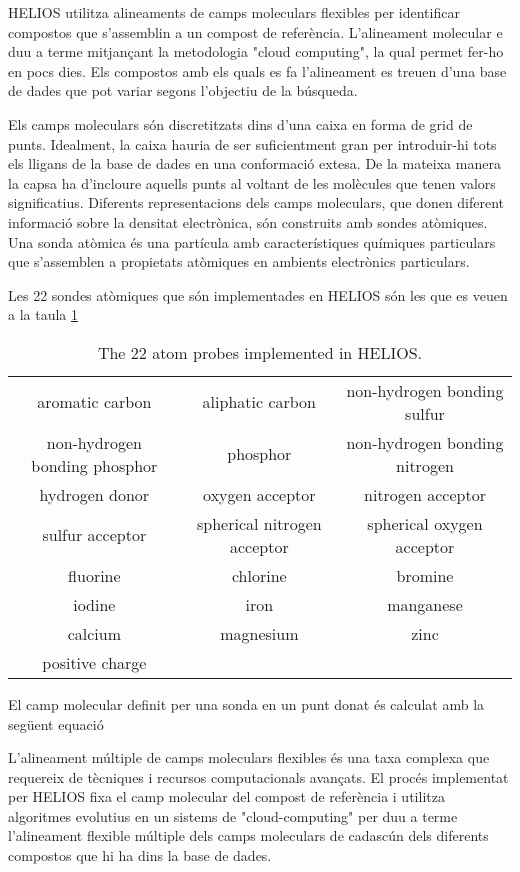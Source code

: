 \documentclass[titlepage,a4paper,12pt]{book}
\begin{document}
HELIOS utilitza alineaments de camps moleculars flexibles per identificar compostos que s'assemblin a un compost de referència. L'alineament molecular e duu a terme mitjançant la metodologia "cloud computing", la qual permet fer-ho en pocs dies. Els compostos amb els quals es fa l'alineament es treuen d'una base de dades que pot variar segons l'objectiu de la búsqueda. 

Els camps moleculars són discretitzats dins d'una caixa en forma de grid de punts. Idealment, la caixa hauria de ser suficientment gran per introduir-hi tots els lligans de la base de dades en una conformació extesa. De la mateixa manera la capsa ha d'incloure aquells punts al voltant de les molècules que tenen valors significatius. Diferents representacions dels camps moleculars, que donen diferent informació sobre la densitat electrònica, són construits amb sondes atòmiques. Una sonda atòmica és una partícula amb característiques químiques particulars que s'assemblen a propietats atòmiques en ambients electrònics particulars. 

Les 22 sondes atòmiques que són implementades en HELIOS són les que  es veuen a la taula \ref{table:maps} 

\begin{table}
\centering
\begin{tabular}{|ccc|}
\hline
aromatic carbon &aliphatic carbon&non-hydrogen bonding sulfur\\
non-hydrogen bonding phosphor&phosphor&non-hydrogen bonding nitrogen\\
hydrogen donor&oxygen acceptor&nitrogen acceptor\\
sulfur acceptor&spherical nitrogen acceptor&spherical oxygen acceptor\\
fluorine&chlorine&bromine\\
iodine&iron&manganese\\
calcium&magnesium&zinc\\
positive charge&& \\
\hline
\end{tabular}
\caption{The 22 atom probes implemented in HELIOS.}
\label{table:maps}
\end{table}

El camp molecular definit per una sonda en un punt donat és calculat amb la
següent equació %

L'alineament múltiple de camps moleculars flexibles és una taxa complexa que requereix de tècniques i recursos computacionals avançats. El procés implementat per HELIOS fixa el camp molecular del compost de referència i utilitza algoritmes evolutius en un sistems de "cloud-computing" per duu a terme l'alineament flexible múltiple dels camps moleculars de cadascún dels diferents compostos que hi ha dins la base de dades.
\end{document}
